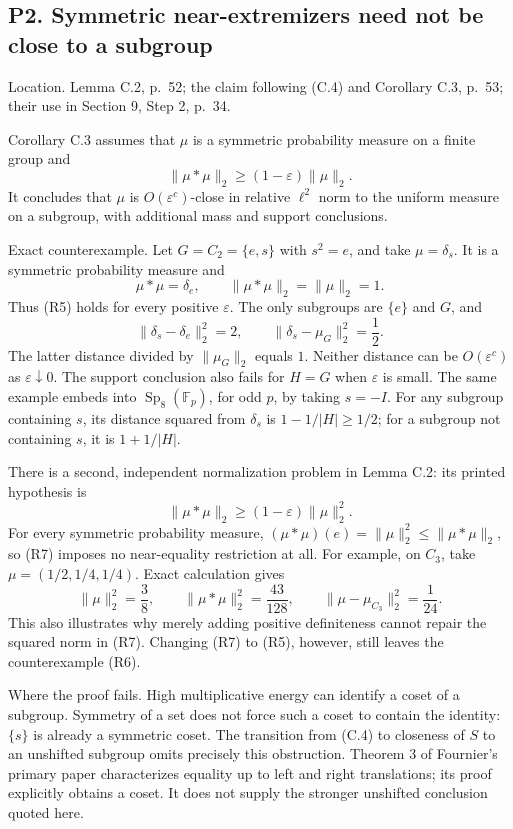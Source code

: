 \documentclass[10pt]{article}
\begin{document}
\subsection*{P2. Symmetric near-extremizers need not be close to a subgroup}
Location. Lemma C.2, p. 52; the claim following (C.4) and Corollary C.3, p. 53; their use in Section 9, Step 2, p. 34.\par
Corollary C.3 assumes that \(\mu\) is a symmetric probability measure on a finite group and \[\|\mu*\mu\|_2\ge(1-\varepsilon)\|\mu\|_2.
 \tag{R5}\] It concludes that \(\mu\) is \(O(\varepsilon^c)\)-close in relative \(\ell^2\) norm to the uniform measure on a subgroup, with additional mass and support conclusions.\par
Exact counterexample. Let \(G=C_2=\{e,s\}\) with \(s^2=e\), and take \(\mu=\delta_s\). It is a symmetric probability measure and \[\mu*\mu=\delta_e,\qquad \|\mu*\mu\|_2=\|\mu\|_2=1.\] Thus (R5) holds for every positive \(\varepsilon\). The only subgroups are \(\{e\}\) and \(G\), and \[\|\delta_s-\delta_e\|_2^2=2,\qquad
 \|\delta_s-\mu_G\|_2^2=\frac12.
 \tag{R6}\] The latter distance divided by \(\|\mu_G\|_2\) equals \(1\). Neither distance can be \(O(\varepsilon^c)\) as \(\varepsilon\downarrow0\). The support conclusion also fails for \(H=G\) when \(\varepsilon\) is small. The same example embeds into \(\operatorname{Sp}_8(\mathbb F_p)\), for odd \(p\), by taking \(s=-I\). For any subgroup containing \(s\), its distance squared from \(\delta_s\) is \(1-1/|H|\ge1/2\); for a subgroup not containing \(s\), it is \(1+1/|H|\).\par
There is a second, independent normalization problem in Lemma C.2: its printed hypothesis is \[\|\mu*\mu\|_2\ge(1-\varepsilon)\|\mu\|_2^2.
 \tag{R7}\] For every symmetric probability measure, \((\mu*\mu)(e)=\|\mu\|_2^2\le\|\mu*\mu\|_2\), so (R7) imposes no near-equality restriction at all. For example, on \(C_3\), take \(\mu=(1/2,1/4,1/4)\). Exact calculation gives \[\|\mu\|_2^2=\frac38,\qquad
 \|\mu*\mu\|_2^2=\frac{43}{128},\qquad
 \|\mu-\mu_{C_3}\|_2^2=\frac1{24}.\] This also illustrates why merely adding positive definiteness cannot repair the squared norm in (R7). Changing (R7) to (R5), however, still leaves the counterexample (R6).\par
Where the proof fails. High multiplicative energy can identify a coset of a subgroup. Symmetry of a set does not force such a coset to contain the identity: \(\{s\}\) is already a symmetric coset. The transition from (C.4) to closeness of \(S\) to an unshifted subgroup omits precisely this obstruction. Theorem 3 of Fournier’s primary paper characterizes equality up to left and right translations; its proof explicitly obtains a coset. It does not supply the stronger unshifted conclusion quoted here.\par
\end{document}

